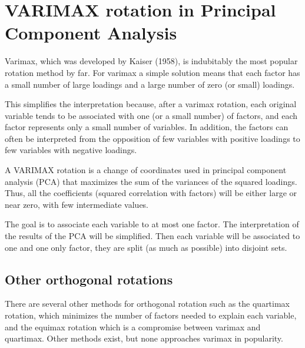 \documentclass[a4paper,12pt]{article}
\begin{document}
\section*{VARIMAX rotation in Principal Component Analysis}
Varimax, which was developed by Kaiser (1958), is indubitably the most
popular rotation method by far. For varimax a simple solution means that each
factor has a small number of large loadings and a large number of zero (or small)
loadings.

This simplifies the interpretation because, after a varimax rotation,
each original variable tends to be associated with one (or a small number) of
factors, and each factor represents only a small number of variables. In addition,
the factors can often be interpreted from the opposition of few variables with
positive loadings to few variables with negative loadings.


A VARIMAX rotation is a change of coordinates used in principal component analysis (PCA) that maximizes the sum of the variances of the squared loadings. Thus, all the coefficients (squared correlation with factors) will be either large or near zero, with few intermediate values.

The goal is to associate each variable to at most one factor. The interpretation of the results of the PCA will be simplified. Then each variable will be associated to one and one only factor, they are split (as much as possible) into disjoint sets.


\subsection{Other orthogonal rotations}
There are several other methods for orthogonal rotation such as the quartimax
rotation, which minimizes the number of factors needed to explain each
variable, and the equimax rotation which is a compromise between varimax
and quartimax. Other methods exist, but none approaches varimax in popularity. 
\end{document}
